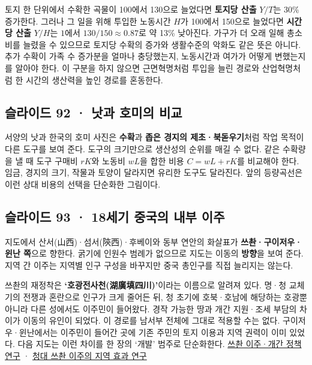 \documentclass[10pt,a4paper]{article}
\begin{document}
토지 한 단위에서 수확한 곡물이 100에서 130으로 늘었다면 \textbf{토지당 산출} $Y/T$는 30\% 증가한다. 그러나 그 일을 위해 투입한 노동시간 $H$가 100에서 150으로 늘었다면 \textbf{시간당 산출} $Y/H$는 $1$에서 $130/150\approx0.87$로 약 13\% 낮아진다. 가구가 더 오래 일해 총소비를 늘렸을 수 있으므로 토지당 수확의 증가와 생활수준의 악화도 같은 뜻은 아니다. 추가 수확이 가족 수 증가분을 얼마나 충당했는지, 노동시간과 여가가 어떻게 변했는지를 알아야 한다. 이 구분을 하지 않으면 근면혁명처럼 투입을 늘린 경로와 산업혁명처럼 한 시간의 생산력을 높인 경로를 혼동한다.\par

\subsection{슬라이드 92 · 낫과 호미의 비교}
서양의 낫과 한국의 호미 사진은 \textbf{수확}과 \textbf{좁은 경지의 제초·북돋우기}처럼 작업 목적이 다른 도구를 보여 준다. 도구의 크기만으로 생산성의 순위를 매길 수 없다. 같은 수확량을 낼 때 도구 구매비 $rK$와 노동비 $wL$을 합한 비용 $C=wL+rK$를 비교해야 한다. 임금, 경지의 크기, 작물과 토양이 달라지면 유리한 도구도 달라진다. 앞의 등량곡선은 이런 상대 비용의 선택을 단순화한 그림이다.\par

\subsection{슬라이드 93 · 18세기 중국의 내부 이주}
지도에서 산서(山西)·섬서(陝西)·후베이와 동부 연안의 화살표가 \textbf{쓰촨·구이저우·윈난 쪽}으로 향한다. 굵기에 인원수 범례가 없으므로 지도는 이동의 \textbf{방향}을 보여 준다. 지역 간 이주는 지역별 인구 구성을 바꾸지만 중국 총인구를 직접 늘리지는 않는다.\par

쓰촨의 재정착은 \textbf{‘호광전사천(湖廣填四川)’}이라는 이름으로 알려져 있다. 명·청 교체기의 전쟁과 혼란으로 인구가 크게 줄어든 뒤, 청 초기에 호북·호남에 해당하는 호광뿐 아니라 다른 성에서도 이주민이 들어왔다. 경작 가능한 땅과 개간 지원·조세 부담의 차이가 이동의 유인이 되었다. 이 경로를 남서부 전체에 그대로 적용할 수는 없다. 구이저우·윈난에서는 이주민이 들어간 곳에 기존 주민의 토지 이용과 지역 권력이 이미 있었다. 다음 지도는 이런 차이를 한 장의 ‘개발’ 범주로 단순화한다. \href{https://ijeas.um.edu.my/index.php/SEJARAH/article/view/55770}{쓰촨 이주·개간 정책 연구} · \href{https://ejournal.ukm.my/gmjss/article/view/78748}{청대 쓰촨 이주의 지역 효과 연구}\par
\end{document}
